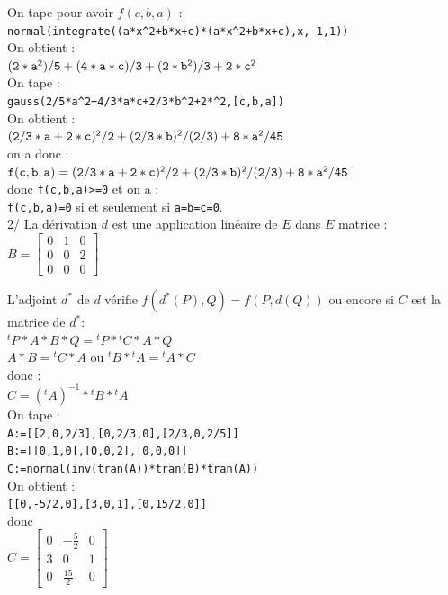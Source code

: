 \documentclass[a4paper,11pt]{book}
\begin{document}
On tape pour avoir $f(c,b,a)$ :\\  
{\tt normal(integrate((a*x\verb|^|2+b*x+c)*(a*x\verb|^|2+b*x+c),x,-1,1))}\\
On obtient :\\
${\tt (2*a^2)/5+(4*a*c)/3+(2*b^2)/3+2*c^2}$\\
On tape :\\  
{\tt gauss(2/5*a\verb|^|2+4/3*a*c+2/3*b\verb|^|2+2*\verb|^|2,[c,b,a])}\\
On obtient :\\
${\tt (2/3*a+2*c)^2/2+(2/3*b)^2/(2/3)+8*a^2/45}$\\
on a donc :\\
${\tt f(c,b,a)=(2/3*a+2*c)^2/2+(2/3*b)^2/(2/3)+8*a^2/45}$\\
donc {\tt f(c,b,a)>=0} et on a :\\
{\tt f(c,b,a)=0} si et seulement si {\tt a=b=c=0}.\\

2/ La d\'erivation $d$ est une application lin\'eaire de $E$ dans $E$ matrice :\\
$B=
\left [\begin{array}{rrr}
0&1&0\\
0&0&2\\
0&0&0 
\end{array}
\right]$  

L'adjoint $d^*$ de $d$ v\'erifie $f(d^*(P),Q)=f(P,d(Q))$ ou encore si $C$ est 
la matrice de $d^*$:\\
${}^tP*A*B*Q={}^tP*{}^tC*A*Q$\\
$A*B={}^tC*A$ ou ${}^t B*{}^tA={}^tA*C$\\
donc :\\
$C=({}^tA)^{-1}*{}^t B*{}^tA$\\
On tape :\\
{\tt A:=[[2,0,2/3],[0,2/3,0],[2/3,0,2/5]]}\\
{\tt B:=[[0,1,0],[0,0,2],[0,0,0]]}\\
{\tt C:=normal(inv(tran(A))*tran(B)*tran(A))}\\
On obtient :\\
{\tt [[0,-5/2,0],[3,0,1],[0,15/2,0]]}\\
donc \\
$C=
\left [\begin{array}{rrr}
0&-\frac{5}{2}&0\\
3&0&1\\
0&\frac{15}{2}&0 
\end{array}
\right]$  
\end{document}

